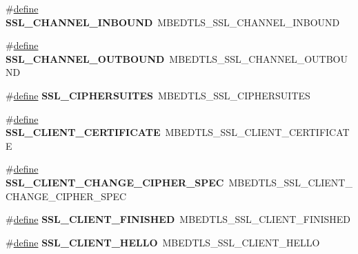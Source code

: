 \begin{DoxyCompactItemize}
\#\hyperlink{structdefine}{define} {\bfseries S\+S\+L\+\_\+\+C\+H\+A\+N\+N\+E\+L\+\_\+\+I\+N\+B\+O\+U\+ND}~M\+B\+E\+D\+T\+L\+S\+\_\+\+S\+S\+L\+\_\+\+C\+H\+A\+N\+N\+E\+L\+\_\+\+I\+N\+B\+O\+U\+ND
\item 
\mbox{\label{compat-1_83_8h_a7727c38450419bb4415e4d69fd3a85e6}} 
\#\hyperlink{structdefine}{define} {\bfseries S\+S\+L\+\_\+\+C\+H\+A\+N\+N\+E\+L\+\_\+\+O\+U\+T\+B\+O\+U\+ND}~M\+B\+E\+D\+T\+L\+S\+\_\+\+S\+S\+L\+\_\+\+C\+H\+A\+N\+N\+E\+L\+\_\+\+O\+U\+T\+B\+O\+U\+ND
\item 
\mbox{\label{compat-1_83_8h_af73cc539c9d46097e9cb75a5bfc43393}} 
\#\hyperlink{structdefine}{define} {\bfseries S\+S\+L\+\_\+\+C\+I\+P\+H\+E\+R\+S\+U\+I\+T\+ES}~M\+B\+E\+D\+T\+L\+S\+\_\+\+S\+S\+L\+\_\+\+C\+I\+P\+H\+E\+R\+S\+U\+I\+T\+ES
\item 
\mbox{\label{compat-1_83_8h_adf2fc74b4933832f25d1dc677c6a3c3c}} 
\#\hyperlink{structdefine}{define} {\bfseries S\+S\+L\+\_\+\+C\+L\+I\+E\+N\+T\+\_\+\+C\+E\+R\+T\+I\+F\+I\+C\+A\+TE}~M\+B\+E\+D\+T\+L\+S\+\_\+\+S\+S\+L\+\_\+\+C\+L\+I\+E\+N\+T\+\_\+\+C\+E\+R\+T\+I\+F\+I\+C\+A\+TE
\item 
\mbox{\label{compat-1_83_8h_a5e7926619a99f463b0c99c94a1384b9b}} 
\#\hyperlink{structdefine}{define} {\bfseries S\+S\+L\+\_\+\+C\+L\+I\+E\+N\+T\+\_\+\+C\+H\+A\+N\+G\+E\+\_\+\+C\+I\+P\+H\+E\+R\+\_\+\+S\+P\+EC}~M\+B\+E\+D\+T\+L\+S\+\_\+\+S\+S\+L\+\_\+\+C\+L\+I\+E\+N\+T\+\_\+\+C\+H\+A\+N\+G\+E\+\_\+\+C\+I\+P\+H\+E\+R\+\_\+\+S\+P\+EC
\item 
\mbox{\label{compat-1_83_8h_a2fd0f5a62a2c6fefcc292f01f766f280}} 
\#\hyperlink{structdefine}{define} {\bfseries S\+S\+L\+\_\+\+C\+L\+I\+E\+N\+T\+\_\+\+F\+I\+N\+I\+S\+H\+ED}~M\+B\+E\+D\+T\+L\+S\+\_\+\+S\+S\+L\+\_\+\+C\+L\+I\+E\+N\+T\+\_\+\+F\+I\+N\+I\+S\+H\+ED
\item 
\mbox{\label{compat-1_83_8h_a7bcc31c04ff8bf761b834f56ff64ce6b}} 
\#\hyperlink{structdefine}{define} {\bfseries S\+S\+L\+\_\+\+C\+L\+I\+E\+N\+T\+\_\+\+H\+E\+L\+LO}~M\+B\+E\+D\+T\+L\+S\+\_\+\+S\+S\+L\+\_\+\+C\+L\+I\+E\+N\+T\+\_\+\+H\+E\+L\+LO
\item 
\mbox{\label{compat-1_83_8h_a2f1d39a5a96e9586c71de1d8cbbcac41}} 

\end{DoxyCompactItemize}

